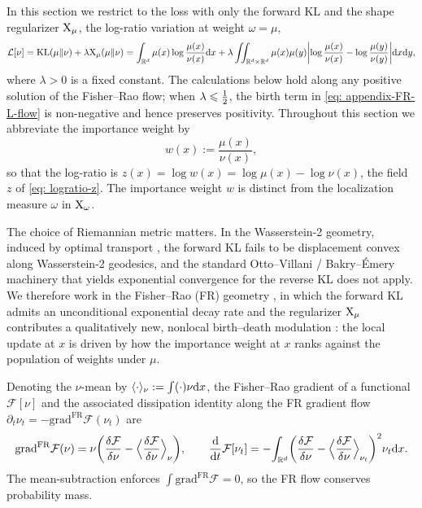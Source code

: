 \documentclass{article}
\begin{document}
In this section we restrict to the loss with only the forward KL and the shape regularizer $\mathrm{X}_\mu$, the log-ratio variation at weight $\omega = \mu$,
\begin{equation}
    \mathcal L[\nu] = \mathrm{KL}(\mu\|\nu) + \lambda  \mathrm{X}_\mu(\mu\|\nu) = \int_{\mathbb R^d} \mu(x) \log \frac{\mu(x)}{\nu(x)} \mathrm{d} x +
    \lambda\iint_{\mathbb R^d\times\mathbb R^d}
     \mu(x)\mu(y) \biggl|\log\frac{\mu(x)}{\nu(x)} - \log\frac{\mu(y)}{\nu(y)}\biggr| \mathrm{d} x \mathrm{d} y,
    \label{eq: appendix-loss-KL-X}
\end{equation}
where $\lambda>0$ is a fixed constant. The calculations below hold along any positive solution of the Fisher--Rao flow; when $\lambda\leqslant\tfrac12$, the birth term in \eqref{eq: appendix-FR-L-flow} is non-negative and hence preserves positivity.
Throughout this section we abbreviate the importance weight by
\begin{equation*}
    w(x) := \frac{\mu(x)}{\nu(x)},
\end{equation*}
so that the log-ratio is $z(x) = \log w(x) = \log\mu(x) - \log\nu(x)$, the field $z$ of \eqref{eq: logratio-z}. The importance weight $w$ is distinct from the localization measure $\omega$ in $\mathrm{X}_\omega$.

The choice of Riemannian metric matters. In the Wasserstein-2 geometry, induced by optimal transport \citep{jordan1998variational,otto2001geometry}, the forward KL fails to be displacement convex along Wasserstein-2 geodesics, and the standard Otto--Villani / Bakry--{\'E}mery machinery \citep{otto2000generalization,bakry2014analysis} that yields exponential convergence for the reverse KL does not apply. We therefore work in the Fisher--Rao (FR) geometry \citep{amari2016information,bauer2016uniqueness}, in which the forward KL admits an unconditional exponential decay rate and the regularizer $\mathrm{X}_\mu$ contributes a qualitatively new, nonlocal birth--death modulation \citep{lu2019accelerating}: the local update at $x$ is driven by how the importance weight at $x$ ranks against the population of weights under $\mu$.

Denoting the $\nu$-mean by $\langle \cdot \rangle_\nu := \int( \cdot ) \nu \mathrm{d} x$, the Fisher--Rao gradient of a functional $\mathcal F[\nu]$ and the associated dissipation identity along the FR gradient flow $\partial_t\nu_t = -\mathrm{grad}^{\mathrm{FR}}\mathcal F(\nu_t)$ are
\begin{equation}
    \mathrm{grad}^{\mathrm{FR}}\mathcal F(\nu) = \nu\biggl(\frac{\delta\mathcal F}{\delta\nu} - \Big\langle\frac{\delta\mathcal F}{\delta\nu}\Big\rangle_\nu\biggr),
    \qquad
    \frac{\mathrm{d}}{\mathrm{d} t}\mathcal F[\nu_t] = -\!\int_{\mathbb R^d}\biggl(\frac{\delta\mathcal F}{\delta\nu} - \Big\langle\frac{\delta\mathcal F}{\delta\nu}\Big\rangle_{\nu_t}\biggr)^{2}\nu_t \mathrm{d} x.
    \label{eq: appendix-FR-gradient}
\end{equation}
The mean-subtraction enforces $\int\mathrm{grad}^{\mathrm{FR}}\mathcal F = 0$, so the FR flow conserves probability mass.
\end{document}
